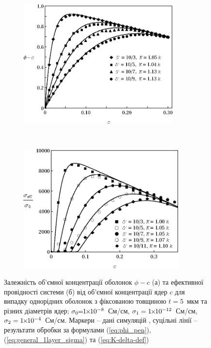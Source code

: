 \documentclass[twoside,a4paper,14pt]{vakaref}
\begin{document}
\begin{figure}[tb]
	\begin{subfigure}[t]{0.5\textwidth}
		\centering
		\includegraphics[height=65mm]{SiekierskiShell_107_103-9.eps}
		\caption{} \label{fig:simulations-phi-a}
	\end{subfigure}%
	~
	\begin{subfigure}[t]{0.5\textwidth}
		\centering
		\includegraphics[height=65mm]{Fig6_Siekierski_HomogeneousLayers_t_fixed2.eps}
		\caption{} \label{fig:simulations-sigma-1layer2005-a}
	\end{subfigure}
	\caption{\label{fig:simulations-phi} 
		Залежність об'ємної концентрації оболонок $\phi-c$ (а) та ефективної провідності системи (б) від об'ємної концентрації ядер $c$ для випадку однорідних оболонок з фіксованою товщиною $t=5$~мкм та різних діаметрів ядер; $\sigma_0 {\mkern-1mu = \mkern-1mu} 1{\mkern-2mu\times\mkern-2mu} 10^{-8}$~См/см, $\sigma_1 = 1{\mkern-2mu\times\mkern-2mu} 10^{-12}$~См/см, $\sigma_2 = 1{\mkern-2mu\times\mkern-2mu} 10^{-4}$~См/см. Маркери -- дані симуляцій \cite{Siekierski2005, Siekierski2007}, суцільні лінії -- результати обробки за формулами (\ref{eq:phi_pen}), (\ref{eq:general_1layer_sigma}) та (\ref{eq:K-delta-def}) }
\vspace{-10pt}
\end{figure}
\end{document}
